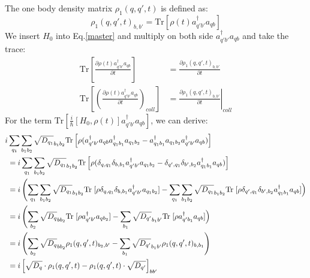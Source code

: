 \documentclass{article}
\begin{document}
The one body density matrix $\rho_1(q,q',t)$ is defined as:
\begin{equation}
    \rho_1(q,q',t)_{b,b'} = \text{Tr}[\rho(t)a^{\dagger}_{q'b'}a_{qb}]
\end{equation}
We insert $H_0$ into Eq.\ref{master} and multiply on both side $a^{\dagger}_{q'b'}a_{qb}$ and take the trace:
\begin{align}
    \text{Tr}\left[ \frac{\partial \rho(t) a^{\dagger}_{q'b'}a_{qb} }{\partial t}  \right] &= \frac{\partial \rho_1(q,q',t)_{b,b'} }{\partial t} \\
    \text{Tr}\left[ \left( \frac{\partial\rho(t) a^{\dagger}_{q'b'}a_{qb} }{\partial t} \right) _{coll} \right] 
        &= \left. \frac{\partial \rho_1(q,q',t)_{b,b'} }{\partial t} \right|_{coll}
\end{align} 
For the term $\text{Tr}\left[\frac{i}{\hbar} \left[H_0, \rho(t)\right]a^{\dagger}_{q'b'}a_{qb}\right]$, we can derive:
\begin{align}
    i &\sum_{q_1} \sum_{b_1b_2} \sqrt{D_{q_1}}_{b_1b_2} \text{Tr}
    \left[ \rho (a^{\dagger}_{q'b'}a_{qb}a^{\dagger}_{q_1b_1}a_{q_1b_2} - a^{\dagger}_{q_1b_1}a_{q_1b_2}a^{\dagger}_{q'b'}a_{qb} ) \right] \notag \\
    &= i\sum_{q_1} \sum_{b_1b_2} \sqrt{D_{q_1}}_{b_1b_2} \text{Tr}
    \left[ \rho ( \delta_{q,q_1}\delta_{b,b_1} a^{\dagger}_{q'b'}a_{q_1b_2} - \delta_{q',q_1}\delta_{b',b_2} a^{\dagger}_{q_1b_1}a_{qb} ) \right] \notag \\
    &= i \left( \sum_{q_1} \sum_{b_1b_2} \sqrt{D_{q_1}}_{b_1b_2} \text{Tr} \right.
       [ \rho \delta_{q,q_1}\delta_{b,b_1} a^{\dagger}_{q'b'}a_{q_1b_2} ] -
    \sum_{q_1} \sum_{b_1b_2} \sqrt{D_{q_1}}_{b_1b_2} \text{Tr} 
    \left. [ \rho \delta_{q',q_1}\delta_{b',b_2} a^{\dagger}_{q_1b_1}a_{qb} ] \right) \notag \\
    &= i \left( \sum_{b_2} \sqrt{D_{q}}_{bb_2} \text{Tr} \right.
       [ \rho a^{\dagger}_{q'b'}a_{qb_2} ] - \sum_{b_1} \sqrt{D_{q'}}_{b_1b'} \text{Tr} 
        \left. [ \rho a^{\dagger}_{q'b_1}a_{qb} ] \right) \notag \\
    &= i \left( \sum_{b_2} \sqrt{D_{q}}_{bb_2} \rho_1(q,q',t)_{b_2,b'} - \sum_{b_1} \sqrt{D_{q'}}_{b_1b'} \rho_1(q,q',t)_{b,b_1} \right) \notag \\
    &= i \left[ \sqrt{D_q}\cdot \rho_1(q,q',t) - \rho_1(q,q',t) \cdot \sqrt{D_{q'}} \right] _{bb'} 
\end{align}
\end{document}
